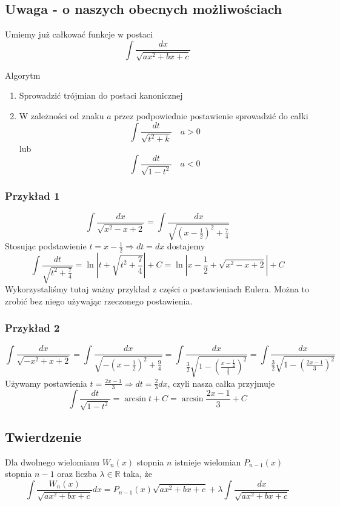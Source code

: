 \documentclass[11pt]{article}
\begin{document}
\subsection{Uwaga - o naszych obecnych możliwościach}
Umiemy już całkować funkcje w postaci $$\int \frac{dx}{\sqrt{ax^2 + bx + c}} $$

Algorytm
\begin{enumerate}
\item{Sprowadzić trójmian do postaci kanonicznej}
\item{W zależności od znaku $a$ przez podpowiednie postawienie sprowadzić do całki
$$ \int \frac{dt}{\sqrt{t^2+k}} \quad a > 0$$
lub
$$ \int \frac{dt}{\sqrt{1-t^2}} \quad a < 0$$}
\end{enumerate} 

\subsubsection{Przykład 1}
$$ \int \frac{dx}{\sqrt{x^2 -x + 2}} = \int \frac{dx}{\sqrt{\left(x-\frac{1}{2}\right)^2 + \frac{7}{4}}} $$
Stosując podstawienie $t = x - \frac{1}{2} \Rightarrow dt = dx$ dostajemy
$$ \int \frac{dt}{\sqrt{t^2+\frac{7}{4}}} = \ln{|t + \sqrt{t^2 + \frac{7}{4}}|} + C= \ln{|x - \frac{1}{2} + \sqrt{x^2 - x + 2}|} + C $$
Wykorzystaliśmy tutaj ważny przykład z części o postawieniach Eulera. Można to zrobić bez niego używając rzeczonego postawienia.
\subsubsection{Przykład 2}
$$ \int \frac{dx}{\sqrt{-x^2 + x + 2}} = \int \frac{dx}{\sqrt{-\left(x-\frac{1}{2}\right)^2 + \frac{9}{4}}} = \int  \frac{dx}{\frac{3}{2} \sqrt{1 -\left(\frac{x-\frac{1}{2}}{\frac{3}{2}}\right)^2}}  = \int  \frac{dx}{\frac{3}{2} \sqrt{1 -\left(\frac{2x - 1}{3}\right)^2}}$$
Używamy postawienia $ t = \frac{2x-1}{3} \Rightarrow dt = \frac{2}{3}dx$, czyli nasza całka przyjmuje
$$ \int \frac{dt}{\sqrt{1-t^2}} = \arcsin{t} + C = \arcsin{\frac{2x-1}{3}} + C$$

\subsection{Twierdzenie}
Dla dwolnego wielomianu $W_n(x)$ stopnia $n$ istnieje wielomian $P_{n-1}(x)$ stopnia $n-1$ oraz liczba $\lambda \in \mathbb{R}$ taka, że
\begin{equation} \int \frac{W_n(x)}{\sqrt{ax^2 + bx + c}}dx = P_{n-1}(x)\sqrt{ax^2 +bx +c} + \lambda \int \frac{dx}{\sqrt{ax^2+bx+c}} \label{eq:calka_2} \end{equation}
\end{document}
